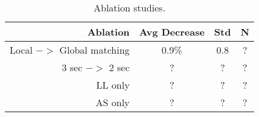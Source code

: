 \begin{table}[!t]
\captionsetup{size=footnotesize}
\centering
\caption{Ablation studies.}\label{tab:ablation}
\footnotesize
\begin{tabular}{r | c c c } \toprule
  Ablation & Avg Decrease & Std &  N  \\
  \midrule
  Local $->$ Global matching & 0.9\% & 0.8 & ?  \\
  3 sec $->$ 2 sec & ? & ? & ?  \\
  LL only & ? & ? & ? \\
  AS only & ? & ? & ? \\
 \bottomrule
\end{tabular}
\end{table}
